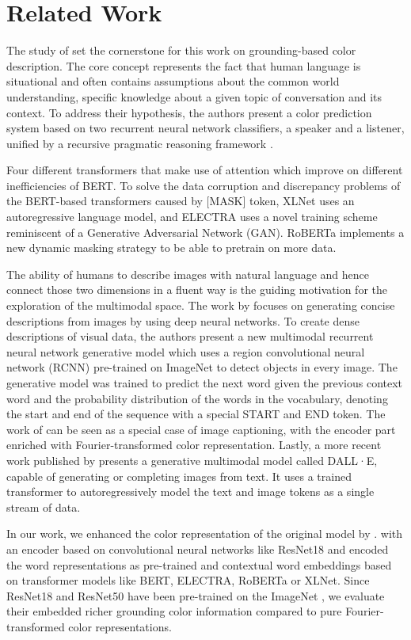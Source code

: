 \section{Related Work}

The study of \citep{monroe-2017-colors} set the cornerstone for this work on grounding-based color description. The core concept represents the fact that human language is situational and often contains assumptions about the common world understanding, specific knowledge about a given topic of conversation and its context. To address their hypothesis, the authors present a color prediction system based on two recurrent neural network classifiers, a speaker and a listener, unified by a recursive pragmatic reasoning framework \citep{monroe-2017-colors}.

\par
Four different transformers that make use of attention which improve on different inefficiencies of BERT. To solve the data corruption and discrepancy problems of the BERT-based transformers caused by [MASK] token, XLNet uses an autoregressive language model, and ELECTRA uses a novel training scheme reminiscent of a Generative Adversarial Network (GAN). RoBERTa implements a new dynamic masking strategy to be able to pretrain on more data.

\par
The ability of humans to describe images with natural language and hence connect those two dimensions in a fluent way is the guiding motivation for the exploration of the multimodal space. The work by \citep{karpathy-2014-image_descriptions} focuses on generating concise descriptions from images by using deep neural networks. To create dense descriptions of visual data, the authors present a new multimodal recurrent neural network generative model which uses a region convolutional neural network (RCNN) pre-trained on ImageNet \citep{deng-2009-imagenet} to detect objects in every image. The generative model was trained to predict the next word given the previous context word and the probability distribution of the words in the vocabulary, denoting the start and end of the sequence with a special START and END token. The work of \citep{monroe-2017-colors} can be seen as a special case of image captioning, with the encoder part enriched with Fourier-transformed color representation. Lastly, a more recent work published by \citep{openai-2020-dalle} presents a generative multimodal model called DALL·E, capable of generating or completing images from text. It uses a trained transformer to autoregressively model the text and image tokens as a single stream of data.

\par
In our work, we enhanced the color representation of the original model by \citep{monroe-2017-colors}. with an encoder based on convolutional neural networks like ResNet18 and encoded the word representations as pre-trained and contextual word embeddings based on transformer models like BERT, ELECTRA, RoBERTa or XLNet. Since ResNet18 and ResNet50 have been pre-trained on the ImageNet \citep{imagenet-2019-dataset}, we evaluate their embedded richer grounding color information compared to pure Fourier-transformed color representations.
